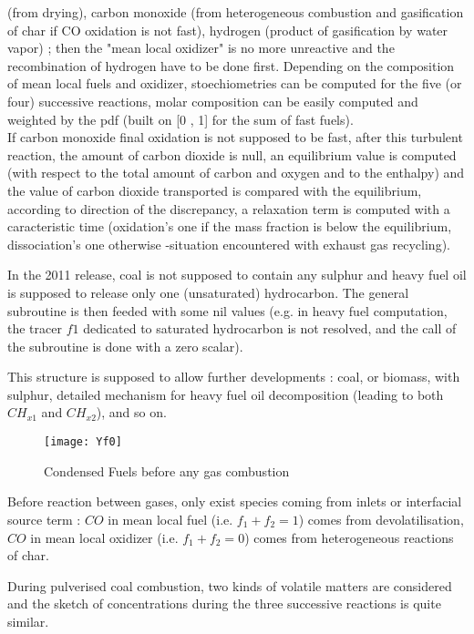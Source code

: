 (from drying), carbon monoxide (from heterogeneous combustion and gasification
of char if CO oxidation is not fast), hydrogen (product of gasification by water
vapor) ; then the "mean local oxidizer" is no more unreactive and the
recombination of hydrogen have to be done first. Depending on the composition of
mean local fuels and oxidizer, stoechiometries can be computed for the five (or
four) successive reactions, molar composition can be easily computed and
weighted by the pdf (built on [0 , 1] for the sum of fast fuels). \\
If carbon monoxide final oxidation is not supposed to be fast, after this
turbulent reaction, the amount of carbon dioxide is null, an equilibrium value
is computed (with respect to the total amount of carbon and oxygen and to the
enthalpy) and the value of carbon dioxide transported is compared with the
equilibrium, according to direction of the discrepancy, a relaxation term is
computed with a caracteristic time (oxidation's one if the mass fraction is
below the equilibrium, dissociation's one otherwise -situation encountered with
exhaust gas recycling).

In the 2011 release, coal is not supposed to contain any sulphur and heavy fuel
oil is supposed to release only one (unsaturated) hydrocarbon. The general
subroutine is then feeded with some nil values (e.g. in heavy fuel computation,
the tracer $f1$ dedicated to saturated hydrocarbon is not resolved, and the call
of the subroutine is done with a zero scalar).

This structure is supposed to allow further developments : coal, or biomass,
with sulphur, detailed mechanism for heavy fuel oil decomposition (leading to
both $CH_{x1}$ and $CH_{x2}$), and so on.

\begin{figure}[h]
\centerline{\texttt{[image: Yf0]}}
\caption{Condensed Fuels before any gas combustion} 
\end{figure}
\vspace{0.2in}
Before reaction between gases, only exist species coming from
inlets or interfacial source term : $CO$ in mean local fuel (i.e. $f_1+f_2=1$)
comes from devolatilisation, $CO$ in mean local oxidizer (i.e. $f_1+f_2=0$)
comes from heterogeneous reactions of char.

During pulverised coal combustion, two kinds of volatile matters are considered
and the sketch of concentrations during the three successive reactions is quite
similar.

